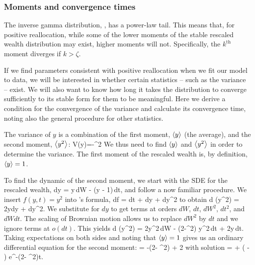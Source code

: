 
\subsubsection{Moments and convergence times}
The inverse gamma distribution, , has a power-law tail. This means that, for positive reallocation, while some of the lower moments of the stable rescaled wealth distribution may exist, higher moments will not. Specifically, the $k^\text{th}$ moment diverges if $k>\zeta$. 

If we find parameters consistent with positive reallocation when we fit our model to data, we will be interested in whether certain statistics -- such as the variance -- exist. We will also want to know how long it takes the distribution to converge sufficiently to its stable form for them to be meaningful. Here we derive a condition for the convergence of the variance and calculate its convergence time, noting also the general procedure for other statistics.

The variance of $y$ is a combination of the first moment, $\left\langle y \right\rangle$ (the average), and the second moment, $\left\langle y^2 \right\rangle$:
\be
V\left(y\right)=-^2
\ee
We thus need to find $\left\langle y \right\rangle$ and $\left\langle y^2 \right\rangle$ in order to determine the variance. The first moment of the rescaled wealth is, by definition, $\left\langle y \right\rangle=1$. 

To find the dynamic of the second moment, we start with the SDE for the rescaled wealth,
\be
dy = \sigma y\,dW - \tau\left(y - 1\right)\,dt,
\ee
and follow a now familiar procedure. We insert $f\left(y,t\right)=y^2$ into \Ito's formula,
\be
df =  dt +  dy +  dy^2
\ee
to obtain
\be
d \left(y^2\right) = 2ydy + dy^2.
\ee
We substitute  for $dy$ to get terms at orders $dW$, $dt$, $dW^2$, $dt^2$, and $dWdt$. The scaling of Brownian motion allows us to replace $dW^2$ by $dt$ and we ignore terms at $o\left(dt\right)$. This yields
\bea
d \left(y^2\right) = 2\sigma y^2\,dW - \left(2\tau-\sigma^2\right) y^2\,dt + 2\tau y\,dt.
\eea
Taking expectations on both sides and noting that $\left\langle y \right\rangle=1$ gives us an ordinary differential equation for the second moment:
\be
{} = -\left(2\tau - \sigma^2\right)  + 2\tau
{}
\ee
with solution
\be
{} =  + \left( - \right) e^{-\left(2\tau - \sigma^2\right)t}.
\ee

